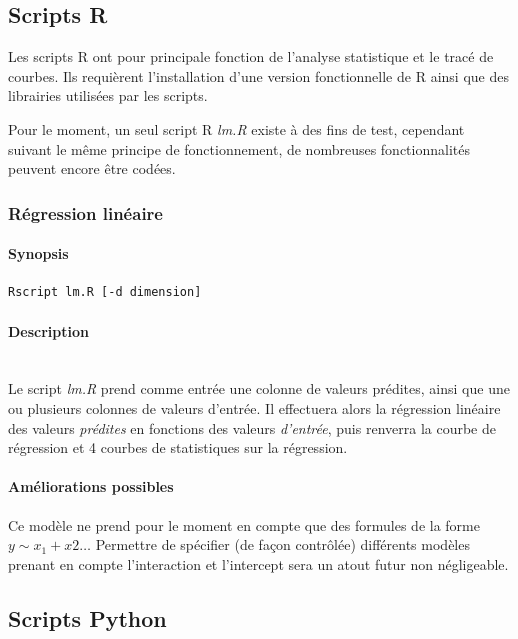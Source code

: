 \documentclass[a4paper]{report}
\begin{document}
\subsection{Scripts R}

Les scripts R ont pour principale fonction de l'analyse statistique et le tracé de courbes. Ils requièrent l'installation d'une version fonctionnelle de R ainsi que des librairies utilisées par les scripts.

Pour le moment, un seul script R \emph{lm.R} existe à des fins de test, cependant suivant le même principe de fonctionnement, de nombreuses fonctionnalités peuvent encore être codées.

\subsubsection{Régression linéaire}

\paragraph{Synopsis}

\begin{verbatim}
Rscript lm.R [-d dimension]
\end{verbatim}

\paragraph{Description}~\\
Le script \emph{lm.R} prend comme entrée une colonne de valeurs prédites, ainsi que une ou plusieurs colonnes de valeurs d'entrée. Il effectuera alors la régression linéaire des valeurs \emph{prédites} en fonctions des valeurs \emph{d'entrée}, puis renverra la courbe de régression et 4 courbes de statistiques sur la régression.

\paragraph{Améliorations possibles}
Ce modèle ne prend pour le moment en compte que des formules de la forme $y \sim x_1+x2 \ldots$
Permettre de spécifier (de façon contrôlée) différents modèles prenant en compte l'interaction et l'intercept sera un atout futur non négligeable.

\subsection{Scripts Python}
\end{document}
